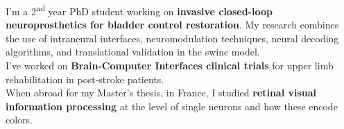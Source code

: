 \documentclass[9pt]{developercv} %
\begin{document}

\begin{minipage}[t]{0.44\textwidth}
	\vspace{-6pt}


    \large 
    I'm a 2\textsuperscript{nd} year PhD student working on \textbf{invasive closed-loop neuroprosthetics for bladder control restoration}. My research combines the use of intraneural interfaces, neuromodulation techniques, neural decoding algorithms, and translational validation in the swine model.\\
    I've worked on \textbf{Brain-Computer Interfaces clinical trials} for upper limb rehabilitation in post-stroke patients.\\
    When abroad for my Master's thesis, in France, I studied \textbf{retinal visual information processing} at the level of single neurons and how these encode colors.\\ 
    
\end{minipage}
\hfill %
\end{document}
